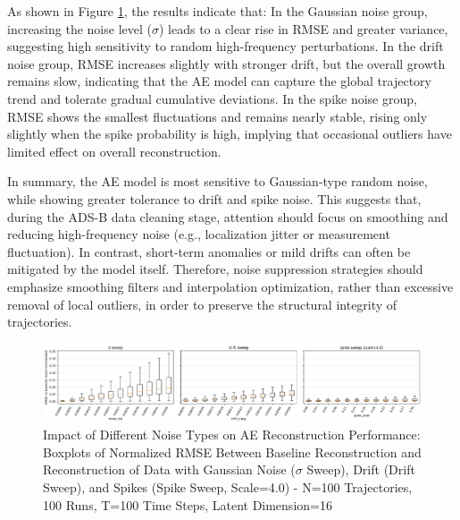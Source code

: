 As shown in Figure \ref{fig:impactofnoise}, the results indicate that:
In the Gaussian noise group, increasing the noise level ($\sigma$) leads to a clear rise in RMSE and greater variance, suggesting high sensitivity to random high-frequency perturbations.
In the drift noise group, RMSE increases slightly with stronger drift, but the overall growth remains slow, indicating that the AE model can capture the global trajectory trend and tolerate gradual cumulative deviations.
In the spike noise group, RMSE shows the smallest fluctuations and remains nearly stable, rising only slightly when the spike probability is high, implying that occasional outliers have limited effect on overall reconstruction.

In summary, the AE model is most sensitive to Gaussian-type random noise, while showing greater tolerance to drift and spike noise. This suggests that, during the ADS-B data cleaning stage, attention should focus on smoothing and reducing high-frequency noise (e.g., localization jitter or measurement fluctuation). In contrast, short-term anomalies or mild drifts can often be mitigated by the model itself. Therefore, noise suppression strategies should emphasize smoothing filters and interpolation optimization, rather than excessive removal of local outliers, in order to preserve the structural integrity of trajectories.

\begin{figure}
	\centering
	\includegraphics[width=1\linewidth]{impact_of_noise2}
	\caption{Impact of Different Noise Types on AE Reconstruction Performance: Boxplots of Normalized RMSE Between Baseline Reconstruction and Reconstruction of Data with Gaussian Noise ($\sigma$ Sweep), Drift (Drift Sweep), and Spikes (Spike Sweep, Scale=4.0) - N=100 Trajectories, 100 Runs, T=100 Time Steps, Latent Dimension=16}
	\label{fig:impactofnoise}
\end{figure}

